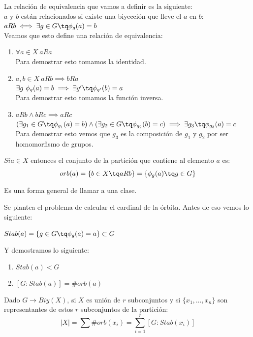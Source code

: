 \documentclass{apuntes}
\begin{document}
La relación de equivalencia que vamos a definir es la siguiente:\\
$a$ y $b$ están relacionados si existe una biyección que lleve el $a$ en $b$:\\ $aRb \iff \exists g\in G \tq \phi _g(a)=b$\\

Veamos que esto define una relación de equivalencia:\\
\begin{enumerate}
\item $\forall a \in X\ aRa$\\Para demostrar esto tomamos la identidad.
\item $a,b \in X\ aRb \implies bRa$\\$\exists g \ \phi_g(a) = b \implies \exists g' \tq \phi _{g'}(b) = a$\\Para demostrar esto tomamos la función inversa.
\item $aRb \wedge bRc \implies aRc$\\$(\exists g_1\in G \tq \phi_{g_1}(a) = b) \wedge (\exists g_2\in G \tq \phi_{g_2}(b) = c) \implies \exists g_3 \tq \phi_{g_3}(a) = c$\\Para demostrar esto vemos que $g_3$ es la composición de $g_1$ y $g_2$ por ser homomorfismo de grupos.
\end{enumerate}

\begin{defn}[Órbita]
$Si a\in X$ entonces el conjunto de la partición que contiene al elemento $a$ es:\\

$$orb(a) = \{ b\in X\tq aRb\} = \{ \phi_g(a) \tq g\in G\}$$

Es una forma general de llamar a una clase.
\end{defn}

Se plantea el problema de calcular el cardinal de la órbita.
Antes de eso vemos lo siguiente:

\begin{defn}[Estabilizador]
$Stab(a) = \{ g\in G \tq \phi_g (a) = a\} \subset G$
\end{defn}

Y demostramos lo siguiente:
\begin{enumerate}
\item $Stab(a) < G$
\item $[G: Stab(a)] = \# orb(a)$
\end{enumerate}

\obs Dado $G\longrightarrow Biy(X)$, si $X$ es unión de $r$ subconjuntos y si $\{ x_1, \hdots, x_n\} $ son representantes de estos $r$ subconjuntos de la partición:\\
$$|X| = \sum \# orb(x_i) = \sum_{i=1}^r[G:Stab(x_i)]$$
\end{document}
